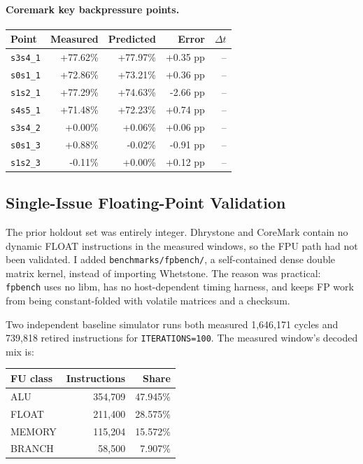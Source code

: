 \documentclass[10pt]{article}
\begin{document}
\paragraph{Coremark key backpressure points.}
\begin{tabular}{@{}lrrrr@{}}
\toprule
Point & Measured & Predicted & Error & $\Delta t$ \\
\midrule
\texttt{s3s4\_1} & +77.62\% & +77.97\% & +0.35 pp & -- \\
\texttt{s0s1\_1} & +72.86\% & +73.21\% & +0.36 pp & -- \\
\texttt{s1s2\_1} & +77.29\% & +74.63\% & -2.66 pp & -- \\
\texttt{s4s5\_1} & +71.48\% & +72.23\% & +0.74 pp & -- \\
\texttt{s3s4\_2} & +0.00\% & +0.06\% & +0.06 pp & -- \\
\texttt{s0s1\_3} & +0.88\% & -0.02\% & -0.91 pp & -- \\
\texttt{s1s2\_3} & -0.11\% & +0.00\% & +0.12 pp & -- \\
\bottomrule
\end{tabular}

\subsection*{Single-Issue Floating-Point Validation}

The prior holdout set was entirely integer. Dhrystone and CoreMark contain no
dynamic FLOAT instructions in the measured windows, so the FPU path had not been
validated. I added \texttt{benchmarks/fpbench/}, a self-contained dense double
matrix kernel, instead of importing Whetstone. The reason was practical:
\texttt{fpbench} uses no libm, has no host-dependent timing harness, and keeps
FP work from being constant-folded with volatile matrices and a checksum.

Two independent baseline simulator runs both measured 1,646,171 cycles and
739,818 retired instructions for \texttt{ITERATIONS=100}. The measured window's
decoded mix is:

\begin{tabular}{@{}lrr@{}}
\toprule
FU class & Instructions & Share \\
\midrule
ALU & 354,709 & 47.945\% \\
FLOAT & 211,400 & 28.575\% \\
MEMORY & 115,204 & 15.572\% \\
BRANCH & 58,500 & 7.907\% \\
\bottomrule
\end{tabular}
\end{document}

